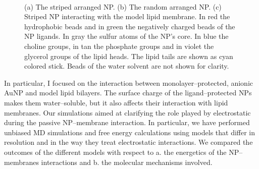 \begin{figure}[!ht]
	\center
	\qquad\qquad%
	\\%
	\caption{(a) The striped arranged \acs{NP}. (b) The random arranged \acs{NP}. (c) Striped \acs{NP} interacting with the model lipid membrane. In red the hydrophobic beads and in green the negatively charged beads of the \acs{NP} ligands. In gray the sulfur atoms of the \acs{NP}'s core. In blue the choline groups, in tan the phosphate groups and in violet the glycerol groups of the lipid heads. The lipid tails are shown as cyan colored stick. Beads of the water solvent are not shown for clarity.}
	\label{fig:NPSummary}
\end{figure}

In particular, I focused on the interaction between monolayer--protected, anionic \ac{AuNP} and model lipid bilayers. The surface charge of the ligand--protected \ac{NP}s makes them water--soluble, but it also affects their interaction with lipid membranes. Our simulations aimed at clarifying the role played by electrostatic during the passive \ac{NP}--membrane interaction. In particular, we have performed unbiased \ac{MD} simulations and free energy calculations using models that differ in resolution and in the way they treat electrostatic interactions. We compared the outcomes of the different models with respect to a. the energetics of the \ac{NP}--membranes interactions and b. the molecular mechanisms involved.

